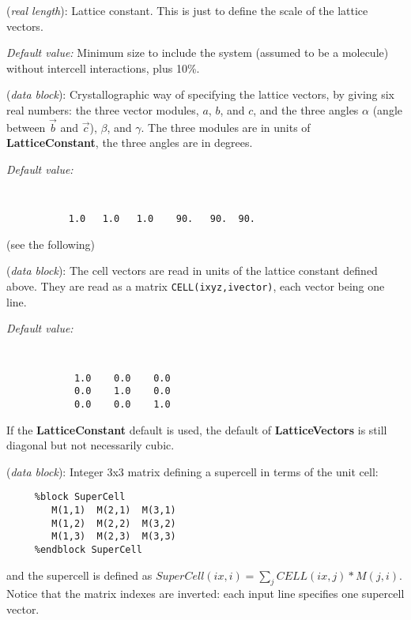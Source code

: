 \documentclass[11pt]{article}
\begin{document}
\begin{description}
\itemsep 10pt
\parsep 0pt


\item[{\bf LatticeConstant}] ({\it real length}): 
Lattice constant. This is just to define the scale of the lattice vectors.

{\it Default value:} Minimum size to include the system (assumed to be a 
molecule) without intercell interactions, plus 10\%. 

\item[{\bf LatticeParameters}] ({\it data block}): 
Crystallographic way of specifying the lattice vectors, by giving
six real numbers: the three vector modules, $a$, $b$, and $c$, and
the three angles $\alpha$ (angle between $\vec b$ and $\vec c$),
$\beta$, and $\gamma$. The three modules are in units of 
{\bf LatticeConstant}, the three angles are in degrees.

{\it Default value:}
{\tt
\begin{verbatim}
           1.0   1.0   1.0    90.   90.  90.
\end{verbatim}
}
\noindent
(see the following)

\item[{\bf LatticeVectors}] ({\it data block}): 
The cell vectors are read in units of the lattice constant defined above. 
They are read as a matrix {\tt CELL(ixyz,ivector)}, each vector being
one line.

{\it Default value:} 
{\tt 
\begin{verbatim}
            1.0    0.0    0.0 
            0.0    1.0    0.0 
            0.0    0.0    1.0 
\end{verbatim}
}
\noindent
If the {\bf LatticeConstant} default is used, the default of 
{\bf LatticeVectors} is still diagonal but not necessarily cubic.

\item[{\bf SuperCell}] ({\it data block}): 
Integer 3x3 matrix defining a supercell in terms of the unit cell: 

\begin{verbatim}
     %block SuperCell
        M(1,1)  M(2,1)  M(3,1) 
        M(1,2)  M(2,2)  M(3,2) 
        M(1,3)  M(2,3)  M(3,3) 
     %endblock SuperCell
\end{verbatim}

and the supercell is defined as
$SuperCell(ix,i) = \sum_j CELL(ix,j)*M(j,i)$.
Notice that the matrix indexes are inverted: each input line 
specifies one supercell vector.


\end{description}
\end{document}
